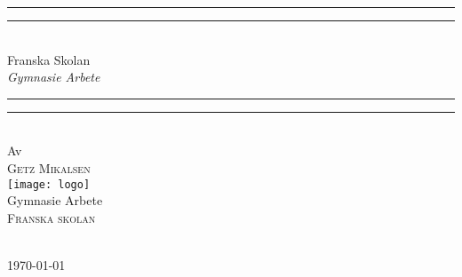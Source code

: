 \begin{titlingpage}
\begin{SingleSpace}
\calccentering{\unitlength}
\vspace*{13pt}
\begin{center}
\rule[0.5ex]{\linewidth}{2pt}\vspace*{-\baselineskip}\vspace*{3.2pt}
\rule[0.5ex]{\linewidth}{1pt}\\[\baselineskip]
{\HUGE Franska Skolan }\\[4mm]
{\Large \textit{Gymnasie Arbete}}\\
\rule[0.5ex]{\linewidth}{1pt}\vspace*{-\baselineskip}\vspace{3.2pt}
\rule[0.5ex]{\linewidth}{2pt}\\
\vspace{6.5mm}
{\large Av}\\
\vspace{6.5mm}
{\large\textsc{Getz Mikalsen}}\\
\vspace{11mm}
\texttt{[image: logo]}\\
\vspace{6mm}
{\large Gymnasie Arbete\\
\textsc{Franska skolan}}\\
\vspace{11mm}
\begin{minipage}{10cm}
\lipsum[66]
\end{minipage}\\
\vspace{9mm}
\today        %
\vspace{12mm}
\end{center}
\end{SingleSpace}

\end{titlingpage}

\pagebreak
